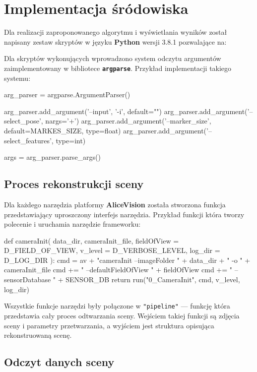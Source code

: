 \section{Implementacja śródowiska}

Dla realizacji zaproponowanego algorytmu i wyświetlania wyników został napisany zestaw skryptów w języku \textbf{Python} wersji 3.8.1 pozwalające na:

Dla skryptów wykonujących wprowadzono system odczytu argumentów zaimplementowany w bibliotece \textbf{\texttt{argparse}}. Przykład implementacji takiego systemu:

\begin{python}
arg_parser = argparse.ArgumentParser()

arg_parser.add_argument('--input', '-i', default="")
arg_parser.add_argument('--select_pose', nargs='+')
arg_parser.add_argument('--marker_size', default=MARKES_SIZE, type=float)
arg_parser.add_argument('--select_features', type=int)

args = arg_parser.parse_args()
\end{python}


\subsection{Proces rekonstrukcji sceny}

Dla każdego narzędzia platformy \textbf{AliceVision} została stworzona funkcja przedstawiający uproszczony interfejs narzędzia.
Przykład funkcji która tworzy polecenie i uruchamia narzędzie frameworku:

\begin{python}
def cameraInit(
 data_dir,
 cameraInit_file,
 fieldOfView = D_FIELD_OF_VIEW,
 v_level = D_VERBOSE_LEVEL,
 log_dir = D_LOG_DIR
):
    cmd = av + "cameraInit --imageFolder " + data_dir + " -o " + cameraInit_file
    cmd += " --defaultFieldOfView " + fieldOfView
    cmd += " --sensorDatabase " + SENSOR_DB
    return run("0_CameraInit", cmd, v_level, log_dir)
\end{python}

Wszystkie funkcje narzędzi były połączone w \texttt{"pipeline"} --- funkcję która przedstawia cały proces odtwarzania sceny.
Wejściem takiej funkcji są zdjęcia sceny i parametry przetwarzania, a wyjściem jest struktura opisująca rekonstruowaną scenę.

\subsection{Odczyt danych sceny}

